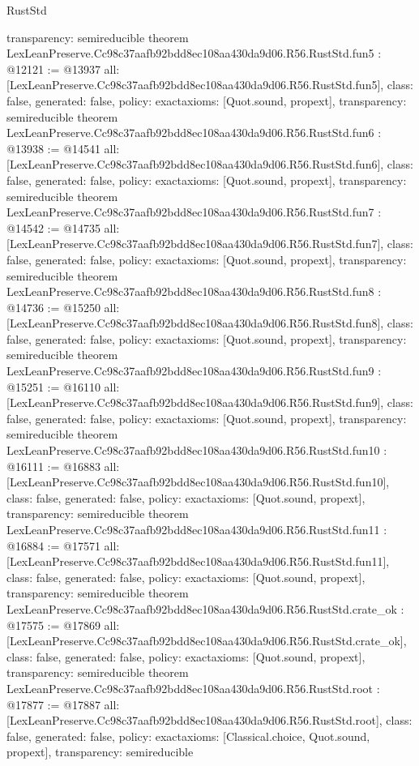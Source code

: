 \begin{lexlean}{RustStd}
\begin{coremodule}
{  transparency: semireducible
}
theorem LexLeanPreserve.Cc98c37aafb92bdd8ec108aa430da9d06.R56.RustStd.fun5 : @12121 := @13937 {
  all: [LexLeanPreserve.Cc98c37aafb92bdd8ec108aa430da9d06.R56.RustStd.fun5],
  class: false,
  generated: false,
  policy: exact{axioms: [Quot.sound, propext]},
  transparency: semireducible
}
theorem LexLeanPreserve.Cc98c37aafb92bdd8ec108aa430da9d06.R56.RustStd.fun6 : @13938 := @14541 {
  all: [LexLeanPreserve.Cc98c37aafb92bdd8ec108aa430da9d06.R56.RustStd.fun6],
  class: false,
  generated: false,
  policy: exact{axioms: [Quot.sound, propext]},
  transparency: semireducible
}
theorem LexLeanPreserve.Cc98c37aafb92bdd8ec108aa430da9d06.R56.RustStd.fun7 : @14542 := @14735 {
  all: [LexLeanPreserve.Cc98c37aafb92bdd8ec108aa430da9d06.R56.RustStd.fun7],
  class: false,
  generated: false,
  policy: exact{axioms: [Quot.sound, propext]},
  transparency: semireducible
}
theorem LexLeanPreserve.Cc98c37aafb92bdd8ec108aa430da9d06.R56.RustStd.fun8 : @14736 := @15250 {
  all: [LexLeanPreserve.Cc98c37aafb92bdd8ec108aa430da9d06.R56.RustStd.fun8],
  class: false,
  generated: false,
  policy: exact{axioms: [Quot.sound, propext]},
  transparency: semireducible
}
theorem LexLeanPreserve.Cc98c37aafb92bdd8ec108aa430da9d06.R56.RustStd.fun9 : @15251 := @16110 {
  all: [LexLeanPreserve.Cc98c37aafb92bdd8ec108aa430da9d06.R56.RustStd.fun9],
  class: false,
  generated: false,
  policy: exact{axioms: [Quot.sound, propext]},
  transparency: semireducible
}
theorem LexLeanPreserve.Cc98c37aafb92bdd8ec108aa430da9d06.R56.RustStd.fun10 : @16111 := @16883 {
  all: [LexLeanPreserve.Cc98c37aafb92bdd8ec108aa430da9d06.R56.RustStd.fun10],
  class: false,
  generated: false,
  policy: exact{axioms: [Quot.sound, propext]},
  transparency: semireducible
}
theorem LexLeanPreserve.Cc98c37aafb92bdd8ec108aa430da9d06.R56.RustStd.fun11 : @16884 := @17571 {
  all: [LexLeanPreserve.Cc98c37aafb92bdd8ec108aa430da9d06.R56.RustStd.fun11],
  class: false,
  generated: false,
  policy: exact{axioms: [Quot.sound, propext]},
  transparency: semireducible
}
theorem LexLeanPreserve.Cc98c37aafb92bdd8ec108aa430da9d06.R56.RustStd.crate_ok : @17575 := @17869 {
  all: [LexLeanPreserve.Cc98c37aafb92bdd8ec108aa430da9d06.R56.RustStd.crate_ok],
  class: false,
  generated: false,
  policy: exact{axioms: [Quot.sound, propext]},
  transparency: semireducible
}
theorem LexLeanPreserve.Cc98c37aafb92bdd8ec108aa430da9d06.R56.RustStd.root : @17877 := @17887 {
  all: [LexLeanPreserve.Cc98c37aafb92bdd8ec108aa430da9d06.R56.RustStd.root],
  class: false,
  generated: false,
  policy: exact{axioms: [Classical.choice, Quot.sound, propext]},
  transparency: semireducible
}


\end{coremodule}
\end{lexlean}
